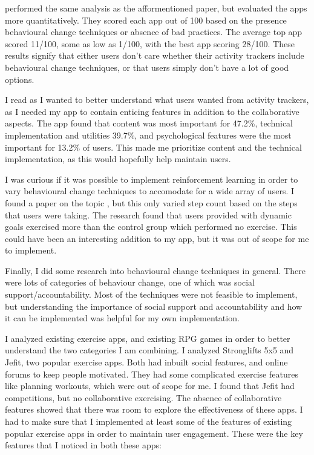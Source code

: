 \documentclass{l4proj}
\begin{document}
\citet{AppsOfSteel} performed the same analysis as the afformentioned paper, but evaluated the apps more quantitatively. They scored each app out of 100 based on the presence behavioural change techniques or absence of bad practices. The average top app scored 11/100, some as low as 1/100, with the best app scoring 28/100. These results signify that either users don't care whether their activity trackers include behavioural change techniques, or that users simply don't have a lot of good options.

I read \citet{User_expectations} as I wanted to better understand what users wanted from activity trackers, as I needed my app to contain enticing features in addition to the collaborative aspects. The app found that content was most important for 47.2\%, technical implementation and utilities 39.7\%, and psychological features were the most important for 13.2\% of users. This made me prioritize content and the technical implementation, as this would hopefully help maintain users.

I was curious if it was possible to implement reinforcement learning in order to vary behavioural change techniques to accomodate for a wide array of users. I found a paper on the topic \citet{Personalizing}, but this only varied step count based on the steps that users were taking. The research found that users provided with dynamic goals exercised more than the control group which performed no exercise. This could have been an interesting addition to my app, but it was out of scope for me to implement.

Finally, I did some research into behavioural change techniques in general. There were lots of categories of behaviour change, one of which was social support/accountability. Most of the techniques were not feasible to implement, but understanding the importance of social support and accountability and how it can be implemented was helpful for my own implementation. \citep{Integrated_Theory}

I analyzed existing exercise apps, and existing RPG games in order to better understand the two categories I am combining. I analyzed Stronglifts 5x5 and Jefit, two popular exercise apps. Both had inbuilt social features, and online forums to keep people motivated. They had some complicated exercise features like planning workouts, which were out of scope for me. I found that Jefit had competitions, but no collaborative exercising. The absence of collaborative features showed that there was room to explore the effectiveness of these apps. I had to make sure that I implemented at least some of the features of existing popular exercise apps in order to maintain user engagement. These were the key features that I noticed in both these apps:
\end{document}
